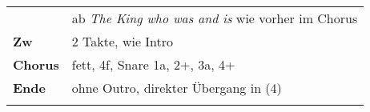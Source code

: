 \begin{tabular}{p{1.6cm}l}
                    & ab \textit{The King who was and is} wie vorher im Chorus          \\
    \textbf{Zw}     & 2 Takte, wie Intro                                                \\
    \textbf{Chorus} & fett, 4f, Snare 1a, 2+, 3a, 4+                                    \\
    \textbf{Ende}   & ohne Outro, direkter Übergang in (4)                              \\
                    &                                                                   \\
\end{tabular}

